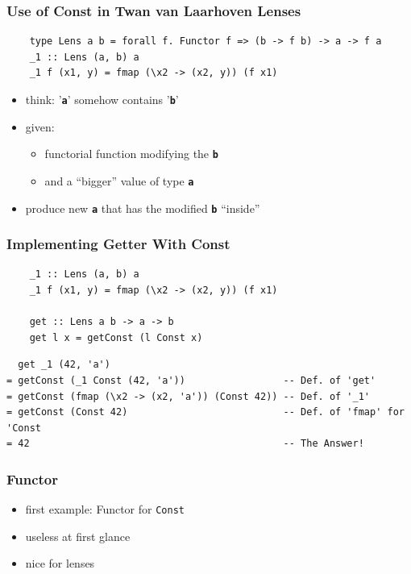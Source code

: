 \documentclass[aspectratio=169]{beamer}
\begin{document}
\begin{frame}[fragile]
  \frametitle{Use of Const in Twan van Laarhoven Lenses}
  \begin{verbatim}
    type Lens a b = forall f. Functor f => (b -> f b) -> a -> f a
    _1 :: Lens (a, b) a
    _1 f (x1, y) = fmap (\x2 -> (x2, y)) (f x1)
  \end{verbatim}
  \vfill
  \begin{itemize}
  \item think: '\textbf{\texttt{a}}' somehow contains '\textbf{\texttt{b}}'
  \item given:
    \begin{itemize}
    \item functorial function modifying the \textbf{\texttt{b}}
    \item and a ``bigger'' value of type \textbf{\texttt{a}}
    \end{itemize}
  \item produce new \textbf{\texttt{a}} that has the modified \textbf{\texttt{b}} ``inside''
  \end{itemize}
\end{frame}

\begin{frame}[fragile]
  \frametitle{Implementing Getter With Const}
  \begin{verbatim}
    _1 :: Lens (a, b) a
    _1 f (x1, y) = fmap (\x2 -> (x2, y)) (f x1)

    get :: Lens a b -> a -> b
    get l x = getConst (l Const x)
  \end{verbatim}
  \vfill
  \begin{verbatim}
  get _1 (42, 'a')
= getConst (_1 Const (42, 'a'))                 -- Def. of 'get'
= getConst (fmap (\x2 -> (x2, 'a')) (Const 42)) -- Def. of '_1'
= getConst (Const 42)                           -- Def. of 'fmap' for 'Const
= 42                                            -- The Answer!
  \end{verbatim}
\end{frame}

\begin{frame}
  \frametitle{Functor}
  \begin{itemize}
  \item first example: Functor for \texttt{Const}
  \item useless at first glance
  \item nice for lenses
  \end{itemize}
\end{frame}
\end{document}
